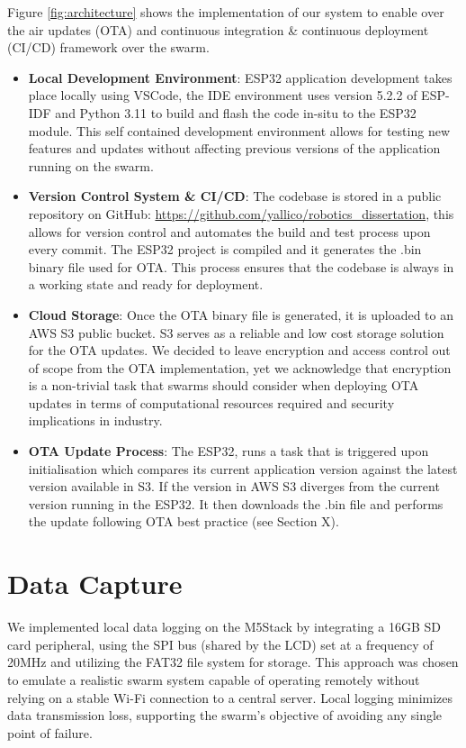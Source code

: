 \documentclass[conference]{IEEEtran}
\begin{document}
Figure \ref{fig:architecture} shows the implementation of our system to enable over the air updates (OTA) and continuous integration \& continuous deployment (CI/CD) framework over the swarm. 
\begin{itemize}
    \item \textbf{Local Development Environment}: ESP32 application development takes place locally using VSCode, the IDE environment uses version 5.2.2 of ESP-IDF and Python 3.11 to build and flash the code in-situ to the ESP32 module. This self contained development environment allows for testing new features and updates without affecting previous versions of the application running on the swarm.
    \item \textbf{Version Control System \& CI/CD}: The codebase is stored in a public repository on GitHub: \url{https://github.com/yallico/robotics_dissertation}, this allows for version control and automates the build and test process upon every commit. The ESP32 project is compiled and it generates the .bin binary file used for OTA. This process ensures that the codebase is always in a working state and ready for deployment.
    \item \textbf{Cloud Storage}: Once the OTA binary file is generated, it is uploaded to an AWS S3 public bucket. S3 serves as a reliable and low cost storage solution for the OTA updates. We decided to leave encryption and access control out of scope from the OTA implementation, yet we acknowledge that encryption is a non-trivial task that swarms should consider when deploying OTA updates in terms of computational resources required and security implications in industry. %
    \item \textbf{OTA Update Process}: The ESP32, runs a task that is triggered upon initialisation which compares its current application version against the latest version available in S3. If the version in AWS S3 diverges from the current version running in the ESP32. It then downloads the .bin file and performs the update following OTA best practice (see Section X). %

\end{itemize}

\section{Data Capture}
We implemented local data logging on the M5Stack by integrating a 16GB SD card peripheral, using the SPI bus (shared by the LCD) set at a frequency of 20MHz and utilizing the FAT32 file system for storage. This approach was chosen to emulate a realistic swarm system capable of operating remotely without relying on a stable Wi-Fi connection to a central server. Local logging minimizes data transmission loss, supporting the swarm's objective of avoiding any single point of failure. 
\end{document}
